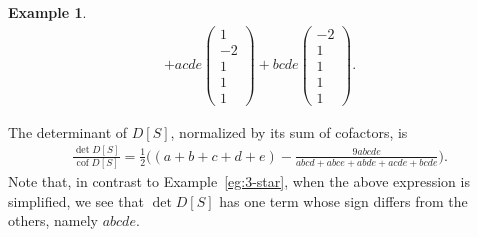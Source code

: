 \documentclass[12pt]{amsart}
\theoremstyle{definition}
\newtheorem{eg}[thm]{Example}
\DeclareMathOperator{\cof}{cof}
\begin{document}
\begin{eg}
\begin{multline}
	+ acde \begin{pmatrix} 1 \\ -2 \\ 1 \\ 1 \\ 1 \end{pmatrix} 
	+ bcde \begin{pmatrix} -2 \\ 1 \\ 1 \\ 1 \\ 1 \end{pmatrix}  .
\end{multline}

The determinant of $D[S]$, normalized by its sum of cofactors, is
\begin{multline}
	\frac{\det D[S]}{\cof D[S]} 
	= \frac{1}{2} \Big( (a + b + c + d + e) 
	 - \frac{9 abcde}{abcd + abce + abde + acde +  bcde} \Big).
\end{multline}
Note that, in contrast to Example~\ref{eg:3-star}, when the above expression is simplified, we see that $\det D[S]$ has one term whose sign differs from the others, namely $abcde$.
\end{eg}




 


\vspace{3mm}
\end{document}
